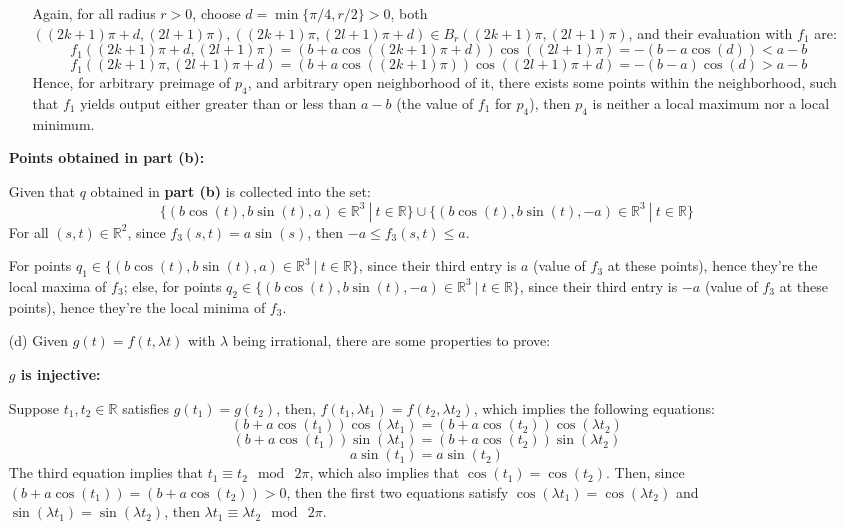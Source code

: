 \documentclass{article}
\begin{document}
\begin{itemize}
\begin{itemize}
        Again, for all radius $r>0$, choose $d=\min\{\pi/4,r/2\}>0$, both $((2k+1)\pi+d, (2l+1)\pi),((2k+1)\pi, (2l+1)\pi+d)\in B_r((2k+1)\pi, (2l+1)\pi)$, and their evaluation with $f_1$ are:
        $$f_1((2k+1)\pi+d, (2l+1)\pi)=(b+a\cos((2k+1)\pi+d))\cos((2l+1)\pi) = -(b-a\cos(d))<a-b$$
        $$f_1((2k+1)\pi, (2l+1)\pi+d)=(b+a\cos((2k+1)\pi))\cos((2l+1)\pi+d) = -(b-a)\cos(d)>a-b$$
        Hence, for arbitrary preimage of $p_4$, and arbitrary open neighborhood of it, there exists some points within the neighborhood, such that $f_1$ yields output either greater than or less than $a-b$ (the value of $f_1$ for $p_4$),
        then $p_4$ is neither a local maximum nor a local minimum.
    \end{itemize}

    \hfil

    \textbf{Points obtained in part (b):}

    Given that $q$ obtained in \textbf{part (b)} is collected into the set:
    $$\{(b\cos(t),b\sin(t),a)\in\mathbb{R}^3\ |\ t\in\mathbb{R}\}\cup \{(b\cos(t),b\sin(t),-a)\in\mathbb{R}^3\ |\ t\in\mathbb{R}\}$$
    For all $(s,t)\in\mathbb{R}^2$, since $f_3(s,t)=a\sin(s)$, then $-a\leq f_3(s,t)\leq a$.

    For points $q_1\in\{(b\cos(t),b\sin(t),a)\in\mathbb{R}^3\ |\ t\in\mathbb{R}\}$, since their third entry is $a$ (value of $f_3$ at these points), hence they're the local maxima of $f_3$;
    else, for points $q_2\in \{(b\cos(t),b\sin(t),-a)\in\mathbb{R}^3\ |\ t\in\mathbb{R}\}$, since their third entry is $-a$ (value of $f_3$ at these points), hence they're the local minima of $f_3$.

    \hfil

    \item[(d)] Given $g(t)=f(t,\lambda t)$ with $\lambda$ being irrational, there are some properties to prove:
    
    \hfil

    \textbf{$g$ is injective:}

    Suppose $t_1,t_2\in\mathbb{R}$ satisfies $g(t_1)=g(t_2)$, then, $f(t_1,\lambda t_1)=f(t_2,\lambda t_2)$, which implies the following equations:
    $$(b+a\cos(t_1))\cos(\lambda t_1)=(b+a\cos(t_2))\cos(\lambda t_2)$$
    $$(b+a\cos(t_1))\sin(\lambda t_1)=(b+a\cos(t_2))\sin(\lambda t_2)$$
    $$a\sin(t_1)=a\sin(t_2)$$
    The third equation implies that $t_1\equiv t_2\mod\ 2\pi$, which also implies that $\cos(t_1)=\cos(t_2)$. Then, since $(b+a\cos(t_1))=(b+a\cos(t_2))>0$, then the first two equations satisfy $\cos(\lambda t_1)=\cos(\lambda t_2)$ and $\sin(\lambda t_1)=\sin(\lambda t_2)$,
    then $\lambda t_1 \equiv \lambda t_2\mod\ 2\pi$.


\end{itemize}
\end{document}
